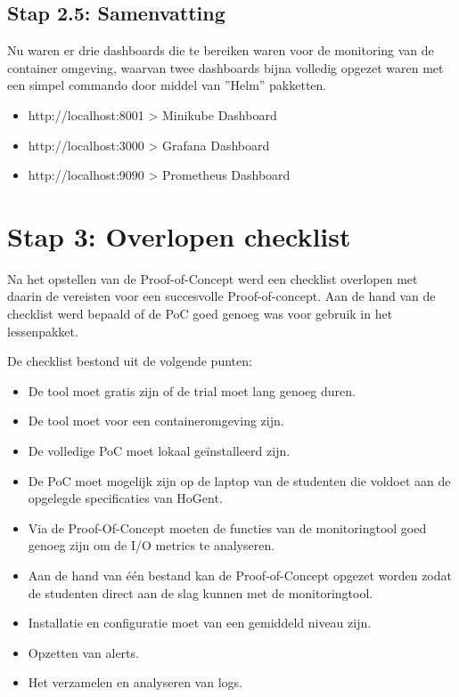 \subsection{Stap 2.5: Samenvatting}


Nu waren er drie dashboards die te bereiken waren voor de monitoring van de container omgeving, waarvan twee dashboards bijna volledig opgezet waren met een simpel commando door middel van ''Helm'' pakketten.

\begin{itemize}
    \item http://localhost:8001 > Minikube Dashboard
    \item http://localhost:3000 > Grafana Dashboard
    \item http://localhost:9090 > Prometheus Dashboard
\end{itemize}\clearpage

\section{Stap 3: Overlopen checklist}

Na het opstellen van de Proof-of-Concept werd een checklist overlopen met daarin de vereisten voor een succesvolle Proof-of-concept. Aan de hand van de checklist werd bepaald of de PoC goed genoeg was voor gebruik in het lessenpakket.

De checklist bestond uit de volgende punten:

\begin{itemize}
    \item De tool moet gratis zijn of de trial moet lang genoeg duren. 
    \item De tool moet voor een containeromgeving zijn.
    \item De volledige PoC moet lokaal geïnstalleerd zijn.
    \item De PoC moet mogelijk zijn op de laptop van de studenten die voldoet aan de opgelegde specificaties van HoGent.
    \item Via de Proof-Of-Concept moeten de functies van de monitoringtool goed genoeg zijn om de I/O metrics te analyseren.
    \item Aan de hand van één bestand kan de Proof-of-Concept opgezet worden zodat de studenten direct aan de slag kunnen met de monitoringtool.
    \item Installatie en configuratie moet van een gemiddeld niveau zijn.
    \item Opzetten van alerts.
    \item Het verzamelen en analyseren van logs. 
\end{itemize}

